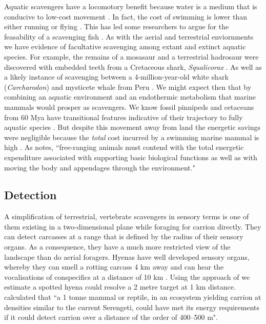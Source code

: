 \documentclass[a4paper,12pt]{article}
\begin{document}
Aquatic scavengers have a locomotory benefit because water is a medium that is conducive to low-cost movement \citep{tucker1975energetic}. 
In fact, the cost of swimming is lower than either running or flying \citep{williams1999evolution}. 
This has led some researchers to argue for the feasability of a scavenging fish \citep{ruxton2004energetic,ruxton2005searching}. 
As with the aerial and terrestrial enviornments we have evidence of facultative scavenging among extant and extinct aquatic species.
For example, the remains of a mosasaur and a terrestrial hadrosaur were discovered with embedded teeth from a Cretaceous shark, \textit{Squalicorax} \citep{schwimmer1997scavenging}.
As well as a likely instance of scavenging between a 4-million-year-old white shark (\textit{Carcharodon}) and mysticete whale from Peru \citep{ehret2009caught}.
We might expect then that by combining an aquatic environment and an endothermic metabolism that marine mammals would prosper as scavengers. 
We know fossil pinnipeds and cetaceans from 60 Mya have transitional features indicative of their trajectory to fully aquatic species \citep{williams1999evolution}.  
But despite this movement away from land the energetic savings were negligible because the \textit{total} cost incurred by a swimming marine mammal is high \citep{williams1999evolution}. 
As \cite{williams1999evolution} notes, ``free-ranging animals must contend with the total energetic expenditure associated with supporting basic biological functions as well as with moving the body and appendages through the environment."

\subsection*{Detection}
A simplification of terrestrial, vertebrate scavengers in sensory terms is one of them existing in a two-dimensional plane while foraging for carrion directly.
They can detect carcasses at a range that is defined by the radius of their sensory organs. %
As a consequence, they have a much more restricted view of the landscape than do aerial foragers.
Hyenas have well developed sensory organs, whereby they can smell a rotting carcass 4 km away and can hear the vocalisations of conspecifics at a distance of 10 km \citep{mills1989comparative}. 
Using the approach of \cite{spiegel2013factors} we estimate a spotted hyena %
could resolve a 2 metre target at 1 km distance. 
\cite{ruxton2004obligate} calculated that ``a 1 tonne mammal or reptile, in an ecosystem yielding carrion at densities similar to the current Serengeti, could have met its energy requirements if it could detect carrion over a distance of the order of 400–500 m".
\end{document}
